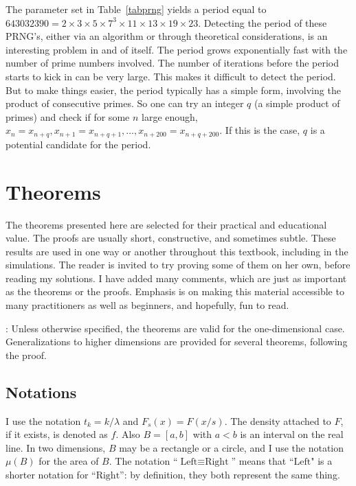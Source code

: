 \documentclass[10pt]{article}
\begin{document}
\noindent The parameter set in Table~\ref{tabprng} yields a 
period equal to $\num{643032390}=2\times3\times5\times7^3\times11\times13\times19\times23$. Detecting the period of these PRNG's, either via an algorithm or through theoretical considerations, is an interesting problem in and of itself. The period grows exponentially fast with the number of prime numbers involved. The number of iterations before the period starts to kick in can be very large. This makes it difficult to detect the period. But to make things easier, the period typically has a simple form, involving the product of consecutive primes. So one can try an integer $q$  (a simple product of primes) and check if for some $n$ large enough, $x_n = x_{n+q}, x_{n+1}=x_{n+q+1},\dots,
x_{n+200}=x_{n+q+200}$. If this is the case, $q$ is a potential candidate for the period.


\section{Theorems}\label{sthm}

The theorems presented here are selected for their practical and educational value. The proofs are usually short, constructive, and sometimes subtle. These results are used in one way or another throughout this textbook, including in the simulations. The reader is invited to try proving some of them on her own, before reading my solutions. I have added many comments, which are just as important as the theorems or the proofs. Emphasis is on making this material accessible to many practitioners as well as beginners, and hopefully, fun to read. 

: Unless otherwise specified, the theorems are valid for the one-dimensional case. Generalizations to higher dimensions are provided for several theorems,
following the proof.


\subsection{Notations}

I use the notation $t_k=k/\lambda$ and $F_s(x) = F(x/s)$. The density attached to $F$, if it exists, is denoted as $f$. Also $B=[a, b]$ with $a<b$ is an interval on the  real line. In two dimensions, $B$ may be a rectangle or a circle, and I use the notation $\mu(B)$ for the area of $B$. The notation ``$\mbox{Left} \equiv \mbox{Right}$'' means that ``$\mbox{Left}$" is a shorter notation for ``$\mbox{Right}$'': by definition, they both represent the same thing.
\end{document}
